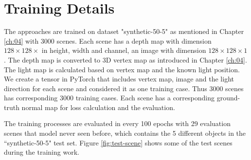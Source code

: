 \documentclass[border=15pt, multi, tikz]{article}
\begin{document}
\section{Training Details}

The approaches are trained on dataset "synthetic-50-5" as mentioned in Chapter \ref{ch:04} with 3000 scenes. Each scene has a depth map with dimension $ 128\times 128 \times $ in height, width and channel, an image with dimension $ 128\times 128 \times 1 $.  The depth map is converted to 3D vertex map as introduced in Chapter \ref{ch:04}. The light map is calculated based on vertex map and the known light position. We create a tensor in PyTorch that includes vertex map, image and the light direction for each scene and considered it as one training case. Thus 3000 scenes has corresponding 3000 training cases. Each scene has a corresponding ground-truth normal map for loss calculation and the evaluation. 

The training processes are evaluated in every 100 epochs with 29 evaluation scenes that model never seen before, which contains the 5 different objects in the ``synthetic-50-5" test set. Figure \ref{fig:test-scene} shows some of the test scenes during the training work.
\end{document}
